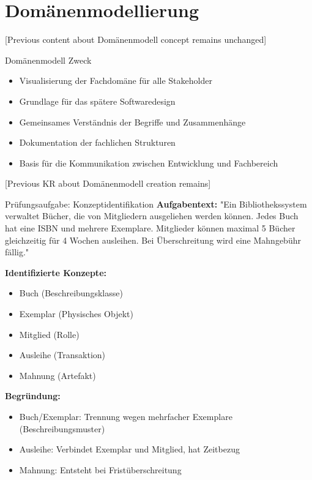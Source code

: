 \section{Domänenmodellierung}

[Previous content about Domänenmodell concept remains unchanged]

\begin{theorem}{Domänenmodell Zweck}
\begin{itemize}
    \item Visualisierung der Fachdomäne für alle Stakeholder
    \item Grundlage für das spätere Softwaredesign
    \item Gemeinsames Verständnis der Begriffe und Zusammenhänge
    \item Dokumentation der fachlichen Strukturen
    \item Basis für die Kommunikation zwischen Entwicklung und Fachbereich
\end{itemize}
\end{theorem}

[Previous KR about Domänenmodell creation remains]

\begin{example}{Prüfungsaufgabe: Konzeptidentifikation}
\textbf{Aufgabentext:} 
"Ein Bibliothekssystem verwaltet Bücher, die von Mitgliedern ausgeliehen werden können. Jedes Buch hat eine ISBN und mehrere Exemplare. Mitglieder können maximal 5 Bücher gleichzeitig für 4 Wochen ausleihen. Bei Überschreitung wird eine Mahngebühr fällig."

\textbf{Identifizierte Konzepte:}
\begin{itemize}
    \item Buch (Beschreibungsklasse)
    \item Exemplar (Physisches Objekt)
    \item Mitglied (Rolle)
    \item Ausleihe (Transaktion)
    \item Mahnung (Artefakt)
\end{itemize}

\textbf{Begründung:}
\begin{itemize}
    \item Buch/Exemplar: Trennung wegen mehrfacher Exemplare (Beschreibungsmuster)
    \item Ausleihe: Verbindet Exemplar und Mitglied, hat Zeitbezug
    \item Mahnung: Entsteht bei Fristüberschreitung
\end{itemize}
\end{example}

